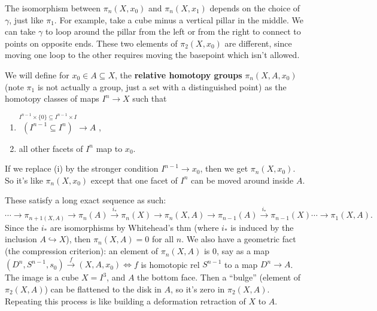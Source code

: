 \begin{note}
    The isomorphism between $\pi_n (X,x_0)$ and $\pi_n (X,x_1)$ depends on the choice of $\gamma$, just like $\pi_1.$ For example, take a cube minus a vertical pillar in the middle. We can take $\gamma$ to loop around the pillar from the left or from the right to connect to points on opposite ends. These two elements of $\pi_2(X,x_0)$ are different, since moving one loop to the other requires moving the basepoint which isn't allowed.
\end{note}
\begin{definition}
    We will define for $x_0\in A\subseteq X$, the \textbf{relative homotopy groups} $\pi_n (X,A,x_0)$ (note $\pi_1$ is not actually a group, just a set with a distinguished point) as the homotopy classes of maps $I^n \to X$ such that 
    \begin{enumerate}[label=(\roman*)]
        \item  $ \overset{I^{n-1}\times \{0\} \subseteq I^{n-1}\times I}{\left( I^{n-1}\subseteq I^n \right) } \to A$ ,
        \item all other facets of $I^n $ map to $x_0$.
    \end{enumerate}
    If we replace (i) by the stronger condition $I^{n-1}\to x_0$, then we get $\pi_n (X,x_0)$. So it's like $\pi_n (X,x_0)$ except that one facet of $I^n $ can be moved around inside $A$.
\end{definition}
    These satisfy a long exact sequence as such:\[
        \cdots \to \pi_{n+1(X,A)}\longrightarrow \pi_n (A)\overset{i_*}{\longrightarrow}  \pi_n (X) \longrightarrow \pi_{n}(X,A) \longrightarrow \pi_{n-1}(A)\overset{i_*}{\longrightarrow} \pi_{n-1}(X)\cdots \to \pi_1(X,A).
    \] Since the $i_*$ are isomorphisms by Whitehead's thm (where $i_*$ is induced by the inclusion $A\hookrightarrow X$), then $\pi_n (X,A)=0$ for all $n$. We also have a geometric fact (the compression criterion): an element of $\pi_n (X,A)$ is 0, say as a map $(D^n ,S^{n-1}, s_0)\overset{f}{\to } (X,A,x_0)\iff f$ is homotopic rel $S^{n-1}$ to a map $D^n \to A$. The image is a cube $X=I^3$, and $A$ the bottom face. Then a ``bulge'' (element of $\pi_2(X,A)$) can be flattened to the disk in $A$, so it's zero in $\pi_2(X,A)$. Repeating this process is like building a deformation retraction of $X$ to $A$.

